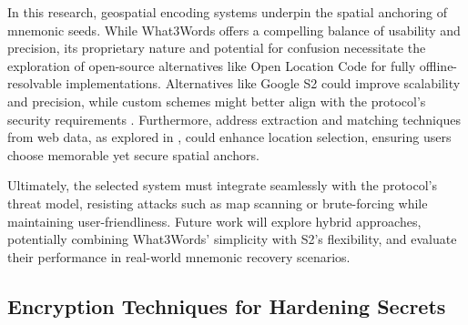 \documentclass[mathematics,article,accept,pdftex,moreauthors]{Definitions/mdpi}
\begin{document}
In this research, geospatial encoding systems underpin the spatial anchoring of mnemonic seeds. While What3Words offers a compelling balance of usability and precision, its proprietary nature and potential for confusion \cite{Arthur2023} necessitate the exploration of open-source alternatives like Open Location Code for fully offline-resolvable implementations. Alternatives like Google S2 could improve scalability and precision, while custom schemes might better align with the protocol's security requirements \cite{Mai2022}. Furthermore, address extraction and matching techniques from web data, as explored in \cite{Efremova2018}, could enhance location selection, ensuring users choose memorable yet secure spatial anchors.

Ultimately, the selected system must integrate seamlessly with the protocol's threat model, resisting attacks such as map scanning or brute-forcing while maintaining user-friendliness. Future work will explore hybrid approaches, potentially combining What3Words' simplicity with S2's flexibility, and evaluate their performance in real-world mnemonic recovery scenarios.

\subsection{%
{Encryption Techniques for Hardening Secrets}}


\end{document}
